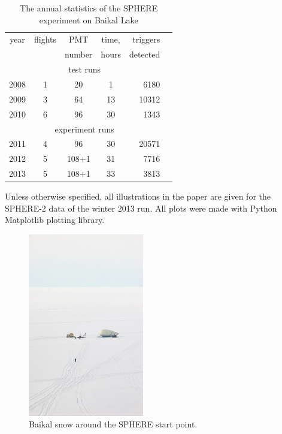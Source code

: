 \documentclass[final,5p,times,twocolumn]{elsarticle}
\begin{document}
\begin{table}[b]
\centering
\caption{The annual statistics of the SPHERE experiment on Baikal Lake
}
\label{tab:statistics}
\vspace{1pc}
\begin{tabular}{|c||c|c|c|r|r|}
\hline
year  & flights & PMT    & time, & triggers \\ 
      &         & number & hours & detected \\ 
\hline \hline
\multicolumn{5}{|c|}{test runs} \\
\hline
2008 & 1 &  20 &  1 &  6180 \\ 
2009 & 3 &  64 & 13 & 10312 \\ 
2010 & 6 &  96 & 30 &  1343 \\
\hline
\multicolumn{5}{|c|}{experiment runs} \\
\hline
2011 & 4 &  96 & 30 & 20571 \\
2012 & 5 & 108+1 & 31 &  7716 \\
2013 & 5 & 108+1 & 33 &  3813 \\
\hline
\end{tabular}
\end{table}

Unless otherwise specified, all illustrations in the paper are given for the \mbox{SPHERE-2} data of the winter 2013 run. All plots were made with Python Matplotlib plotting library.

\begin{figure}[tb]
    \includegraphics[width=0.45\textwidth]{DSC_4049.jpg}\hspace{2pc}%
    \caption{Baikal snow around the SPHERE start point.}
\label{fig:baikal_snow}
\end{figure}
\end{document}
